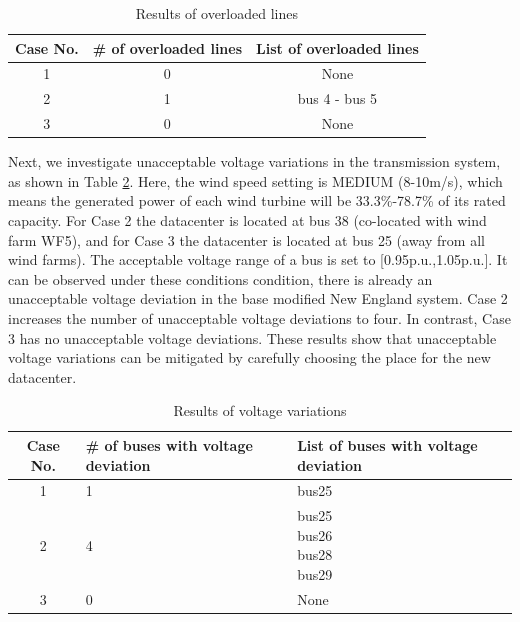 \begin{table}[ht]
\begin{center}
\caption{Results of overloaded lines}
\begin{tabular}{|c|c|c|}
\hline
Case No. & \# of overloaded lines & List of overloaded lines \\
\hline
1 & 0 & None\\
2 & 1 &  bus 4 - bus 5 \\
3 & 0 & None \\

\hline

\end{tabular}
\label{tab:results-linevio}
\end{center}
\end{table}

Next, we investigate unacceptable voltage variations in the
transmission system, as shown in Table \ref{tab:results-volvio}. Here,
the wind speed setting is MEDIUM (8-10m/s), which means the generated
power of each wind turbine will be 33.3\%-78.7\% of its rated
capacity.  For Case 2 the datacenter is located at bus 38 (co-located
with wind farm WF5), and for Case 3 the datacenter is located at bus
25 (away from all wind farms). The acceptable voltage range of a bus
is set to [0.95p.u.,1.05p.u.]. It can be observed under these
conditions condition, there is already an unacceptable voltage
deviation in the base modified New England system.  Case 2 increases
the number of unacceptable voltage deviations to four.  In contrast,
Case 3 has no unacceptable voltage deviations.  These results show
that unacceptable voltage variations can be mitigated by carefully
choosing the place for the new datacenter.

\begin{table}[ht]
\begin{center}
\caption{Results of voltage variations}
\begin{tabular}{|c|p{1in}|p{1in}|}
\hline
Case No. & \# of buses with voltage deviation & List of buses with voltage deviation  \\
\hline
1 & 1 & bus25\\
\hline
2 & 4 & \tabincell{c}{bus25\\bus26\\bus28\\bus29}\\
\hline
3 & 0 & None \\

\hline

\end{tabular}
\label{tab:results-volvio}
\end{center}
\end{table}

